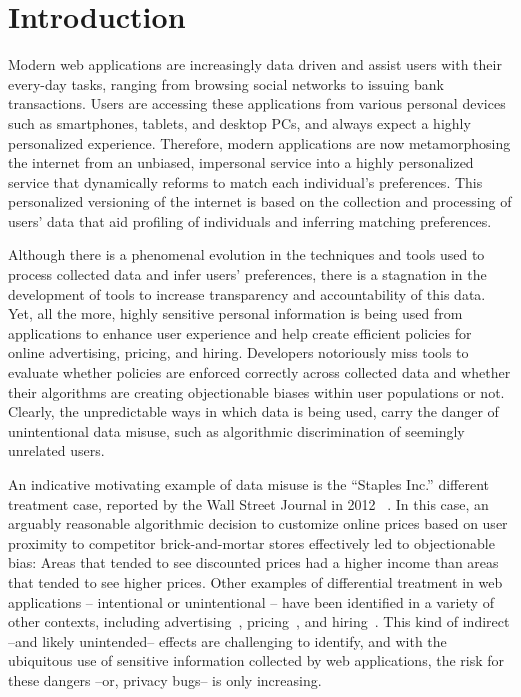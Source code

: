 
\section{Introduction}

Modern web applications are increasingly data driven and assist users
with their every-day tasks, ranging from browsing social networks to
issuing bank transactions. Users are accessing these applications from
various personal devices such as smartphones, tablets, and desktop PCs,
and always expect a highly personalized experience. Therefore, modern
applications are now metamorphosing the internet from an unbiased, impersonal
service into a highly personalized service that dynamically reforms to match
each individual's preferences. This personalized versioning of the internet
is based on the collection and processing of users' data that aid profiling
of individuals and inferring matching preferences.

Although there is a phenomenal evolution in the techniques and tools used to
process collected data and infer users' preferences, there is a stagnation
in the development of tools to increase transparency and accountability of
this data. Yet, all the more,  highly sensitive personal information is being
used from applications to enhance user experience and help create efficient
policies for online advertising, pricing, and hiring.
Developers notoriously miss tools to evaluate whether policies are
enforced correctly across collected data and whether their algorithms are
creating objectionable biases within user populations or not. Clearly,
the unpredictable ways in which data is being used, carry the danger of
unintentional data misuse, such as algorithmic discrimination of seemingly
unrelated users.

An indicative motivating example of data misuse is the ``Staples Inc.''
different treatment case, reported by the Wall Street Journal in 2012
~\cite{Staples}. In this case, an arguably reasonable algorithmic decision
to customize online prices based on user proximity to competitor
brick-and-mortar stores effectively led to objectionable bias:
Areas that tended to see discounted prices had a higher income than areas
that tended to see higher prices. Other examples of differential treatment in
web applications – intentional or unintentional – have been identified in a
variety of other contexts, including
advertising~\cite{Sweeney:AdDiscrimination},
pricing~\cite{Hannak:PriceDiscrimination}, and
hiring~\cite{acquisiti:HiringDiscrimination}. This kind of indirect --and likely
unintended-- effects are challenging to identify, and with the ubiquitous use
of sensitive information collected by web applications, the risk for these
dangers --or, privacy bugs-- is only increasing.

